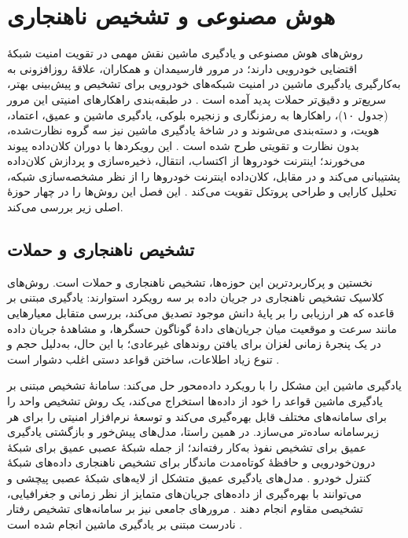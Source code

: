 \documentclass[12pt,a4paper]{article}
\begin{document}
\section{هوش مصنوعی و تشخیص ناهنجاری}

روش‌های هوش مصنوعی و یادگیری ماشین نقش مهمی در تقویت امنیت شبکهٔ اقتضایی خودرویی دارند؛ در مرور فارسیمدان و همکاران، علاقهٔ روزافزونی به به‌کارگیری یادگیری ماشین در امنیت شبکه‌های خودرویی برای تشخیص و پیش‌بینی بهتر، سریع‌تر و دقیق‌تر حملات پدید آمده است \cite{farsimadanReviewSecurityChallenges2025}. در طبقه‌بندی راهکار‌های امنیتی این مرور (جدول ۱۰)، راهکار‌ها به رمزنگاری و زنجیره بلوکی، یادگیری ماشین و عمیق، اعتماد، هویت، و  دسته‌بندی می‌شوند و در شاخهٔ یادگیری ماشین نیز سه گروه نظارت‌شده، بدون نظارت و تقویتی طرح شده است \cite{farsimadanReviewSecurityChallenges2025}. این رویکرد‌ها با دوران کلان‌داده پیوند می‌خورند؛ اینترنت خودرو‌ها از اکتساب، انتقال، ذخیره‌سازی و پردازش کلان‌داده پشتیبانی می‌کند و در مقابل، کلان‌داده اینترنت خودرو‌ها را از نظر مشخصه‌سازی شبکه، تحلیل کارایی و طراحی پروتکل تقویت می‌کند \cite{xuInternetVehiclesBig2018}. این فصل این روش‌ها را در چهار حوزهٔ اصلی زیر بررسی می‌کند.

\subsection{تشخیص ناهنجاری و حملات}

نخستین و پرکاربردترین این حوزه‌ها، تشخیص ناهنجاری و حملات است. روش‌های کلاسیک تشخیص ناهنجاری در جریان داده بر سه رویکرد استوارند: یادگیری مبتنی بر قاعده که هر ارزیابی را بر پایهٔ دانش موجود تصدیق می‌کند، بررسی متقابل معیار‌هایی مانند سرعت و موقعیت میان جریان‌های دادهٔ گوناگون حسگرها، و مشاهدهٔ جریان داده در یک پنجرهٔ زمانی لغزان برای یافتن روند‌های غیرعادی؛ با این حال، به‌دلیل حجم و تنوع زیاد اطلاعات، ساختن قواعد دستی اغلب دشوار است \cite{farsimadanReviewSecurityChallenges2025}.

یادگیری ماشین این مشکل را با رویکرد داده‌محور حل می‌کند: سامانهٔ تشخیص مبتنی بر یادگیری ماشین قواعد را خود از داده‌ها استخراج می‌کند، یک روش تشخیص واحد را برای سامانه‌های مختلف قابل بهره‌گیری می‌کند و توسعهٔ نرم‌افزار امنیتی را برای هر زیرسامانه ساده‌تر می‌سازد. در همین راستا، مدل‌های پیش‌خور و بازگشتی یادگیری عمیق برای تشخیص نفوذ به‌کار رفته‌اند؛ از جمله شبکهٔ عصبی عمیق برای شبکهٔ درون‌خودرویی و حافظهٔ کوتاه‌مدت ماندگار  برای تشخیص ناهنجاری داده‌های شبکهٔ کنترل خودرو \cite{farsimadanReviewSecurityChallenges2025}. مدل‌های یادگیری عمیق متشکل از لایه‌های شبکهٔ عصبی پیچشی  و  می‌توانند با بهره‌گیری از داده‌های جریان‌های متمایز از نظر زمانی و جغرافیایی، تشخیصی مقاوم انجام دهند \cite{farsimadanReviewSecurityChallenges2025}. مرور‌های جامعی نیز بر سامانه‌های تشخیص رفتار نادرست مبتنی بر یادگیری ماشین انجام شده است \cite{farsimadanReviewSecurityChallenges2025}.
\end{document}

